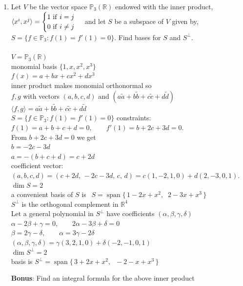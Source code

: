 \documentclass{article}
\begin{document}
{{\begin{enumerate}
\newpage\item Let $V$ be the vector space $\mathbb{P}_3(\mathbb{R})$ endowed with the inner product, $\langle x^i,x^j\rangle=\begin{cases}
1~{\rm if}~i=j\\
0~{\rm if}~i\neq j
\end{cases}$ and let $S$ be a subspace of $V$ given by, $S=\{f\in\mathbb{P}_3: f(1)=f'(1)=0\}$. Find bases for $S$ and $S^{\perp}$. 
\\
\\$V=\mathbb{P}_3(\mathbb{R})$
\\monomial basis $\{1,x,x^2,x^3\}$
\\$f(x)=a+bx+cx^2+dx^3$
\\inner product makes monomial orthonormal so
\\$f,g$ with vectors $(a,b,c,d)$ and $(a\tilde a + b\tilde b + c\tilde c + d\tilde d)$
\\$\langle f,g\rangle = a\tilde a + b\tilde b + c\tilde c + d\tilde d$
\\$S=\{f\in\mathbb P_3: f(1)=f'(1)=0\}$ constraints:
\\$f(1)=a+b+c+d=0,\qquad f'(1)=b+2c+3d=0.$
\\From $b+2c+3d=0$ we get 
\\$b=-2c-3d$
\\$a=-(b+c+d)=c+2d$
\\coefficient vector: $(a,b,c,d)=(c+2d,\,-2c-3d,\,c,\,d)= c(1,-2,1,0)+d(2,-3,0,1).$
\\$\dim S=2$
\\a convenient basis of $S$ is $\,\;S=\operatorname{span}\{\,1-2x+x^2,\;\;2-3x+x^3\,\}$
\\$S^\perp$ is the orthogonal complement in $\mathbb R^4$
\\Let a general polynomial in $S^\perp$ have coefficients $(\alpha,\beta,\gamma,\delta)$
\\$\alpha-2\beta+\gamma=0,\qquad 2\alpha-3\beta+\delta=0$
\\$\beta=2\gamma-\delta,\qquad \alpha=3\gamma-2\delta$
\\$(\alpha,\beta,\gamma,\delta)=\gamma(3,2,1,0)+\delta(-2,-1,0,1)$
\\$\dim S^\perp=2$
\\basis is $S^\perp=\operatorname{span}\{\,3+2x+x^2,\;\;-2-x+x^3\,\}$

\bigskip

{\large\bf Bonus}: Find an integral formula for the above inner product


\end{enumerate}}}
\end{document}
